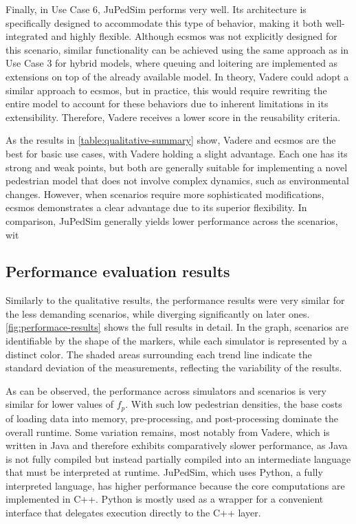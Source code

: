\documentclass[twoside, 11pt]{article}
\begin{document}
Finally, in Use Case 6, JuPedSim performs very well. Its architecture is specifically designed to accommodate this type of behavior, making it both well-integrated and highly flexible. Although \gls{ecsmos} was not explicitly designed for this scenario, similar functionality can be achieved using the same approach as in Use Case 3 for hybrid models, where queuing and loitering are implemented as extensions on top of the already available model. In theory, Vadere could adopt a similar approach to \gls{ecsmos}, but in practice, this would require rewriting the entire model to account for these behaviors due to inherent limitations in its extensibility. Therefore, Vadere receives a lower score in the reusability criteria.


As the results in \autoref{table:qualitative-summary} show, Vadere and \gls{ecsmos} are the best for basic use cases, with Vadere holding a slight advantage. Each one has its strong and weak points, but both are generally suitable for implementing a novel pedestrian model that does not involve complex dynamics, such as environmental changes. However, when scenarios require more sophisticated modifications, \gls{ecsmos} demonstrates a clear advantage due to its superior flexibility. In comparison, JuPedSim generally yields lower performance across the scenarios, wit


\subsection{Performance evaluation results}

Similarly to the qualitative results, the performance results were very similar for the less demanding scenarios, while diverging significantly on later ones. \autoref{fig:performace-results} shows the full results in detail. In the graph, scenarios are identifiable by the shape of the markers, while each simulator is represented by a distinct color. The shaded areas surrounding each trend line indicate the standard deviation of the measurements, reflecting the variability of the results.

As can be observed, the performance across simulators and scenarios is very similar for lower values of $f_p$. With such low pedestrian densities, the base costs of loading data into memory, pre-processing, and post-processing dominate the overall runtime. Some variation remains, most notably from Vadere, which is written in Java and therefore exhibits comparatively slower performance, as Java is not fully compiled but instead partially compiled into an intermediate language that must be interpreted at runtime. JuPedSim, which uses Python, a fully interpreted language, has higher performance because the core computations are implemented in C++. Python is mostly used as a wrapper for a convenient interface that delegates execution directly to the C++ layer.
\end{document}
